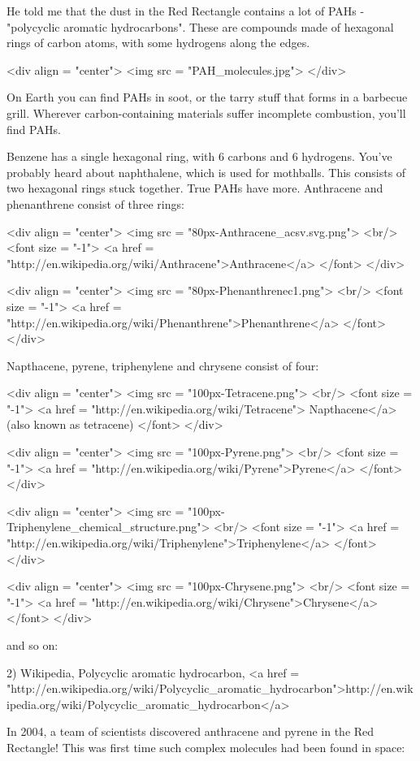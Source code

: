 He told me that the dust in the Red Rectangle contains a lot of PAHs -
"polycyclic aromatic hydrocarbons".  These are compounds made of 
hexagonal rings of carbon atoms, with some hydrogens along the edges.

<div align = "center">
<img src = "PAH_molecules.jpg">
</div>

On Earth you can find PAHs in soot, or the tarry stuff that forms 
in a barbecue grill.  Wherever carbon-containing materials suffer
incomplete combustion, you'll find PAHs.  

Benzene has a single hexagonal ring, with 6 carbons and 6 hydrogens.
You've probably heard about naphthalene, which is used for mothballs.
This consists of two hexagonal rings stuck together.  True PAHs have
more.  Anthracene and phenanthrene consist of
three rings:

<div align = "center">
<img src = "80px-Anthracene_acsv.svg.png">
<br/>
<font size = "-1">
<a href = "http://en.wikipedia.org/wiki/Anthracene">Anthracene</a>
</font>
</div>

<div align = "center">
<img src = "80px-Phenanthrenec1.png">
<br/>
<font size = "-1">
<a href = "http://en.wikipedia.org/wiki/Phenanthrene">Phenanthrene</a>
</font>
</div>

Napthacene, pyrene,
triphenylene and chrysene consist of four:

<div align = "center">
<img src = "100px-Tetracene.png">
<br/>
<font size = "-1">
<a href = "http://en.wikipedia.org/wiki/Tetracene">
Napthacene</a> (also known as tetracene)
</font>
</div>

<div align = "center">
<img src = "100px-Pyrene.png">
<br/>
<font size = "-1">
<a href = "http://en.wikipedia.org/wiki/Pyrene">Pyrene</a>
</font>
</div>

<div align = "center">
<img src = "100px-Triphenylene_chemical_structure.png">
<br/>
<font size = "-1">
<a href = "http://en.wikipedia.org/wiki/Triphenylene">Triphenylene</a>
</font>
</div>

<div align = "center">
<img src = "100px-Chrysene.png">
<br/>
<font size = "-1">
<a href = "http://en.wikipedia.org/wiki/Chrysene">Chrysene</a>
</font>
</div>



and so on:

2) Wikipedia, Polycyclic aromatic hydrocarbon, 
<a href = "http://en.wikipedia.org/wiki/Polycyclic_aromatic_hydrocarbon">http://en.wikipedia.org/wiki/Polycyclic_aromatic_hydrocarbon</a>

In 2004, a team of scientists discovered anthracene and pyrene in the 
Red Rectangle!  This was first time such complex molecules had been 
found in space:

